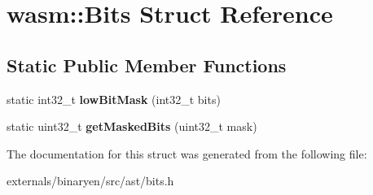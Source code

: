 \hypertarget{structwasm_1_1_bits}{}\section{wasm\+:\+:Bits Struct Reference}
\label{structwasm_1_1_bits}
\subsection*{Static Public Member Functions}
\begin{DoxyCompactItemize}
\item 
\mbox{\label{structwasm_1_1_bits_abef58583c224b673d82763d07edb20bb}} 
static int32\+\_\+t {\bfseries low\+Bit\+Mask} (int32\+\_\+t bits)
\item 
\mbox{\label{structwasm_1_1_bits_a62518b65700d7f5c9919f5933f7a3a45}} 
static uint32\+\_\+t {\bfseries get\+Masked\+Bits} (uint32\+\_\+t mask)
\end{DoxyCompactItemize}


The documentation for this struct was generated from the following file\+:\begin{DoxyCompactItemize}
\item 
externals/binaryen/src/ast/bits.\+h\end{DoxyCompactItemize}
